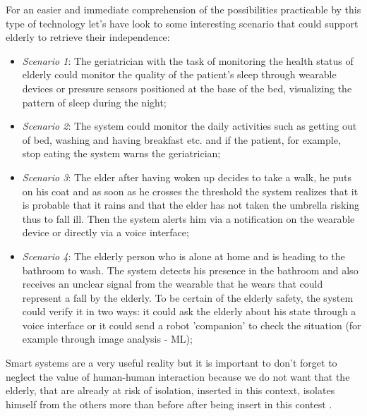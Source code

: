 \documentclass{thesisreport}
\begin{document}
 For an easier and immediate comprehension of the possibilities practicable by this type of technology let's have look to some interesting scenario that could support elderly to retrieve their independence:
 \begin{itemize}
     \item \textit{Scenario 1}: The geriatrician with the task of monitoring the health status of elderly could monitor the quality of the patient's sleep through wearable devices or pressure sensors positioned at the base of the bed, visualizing the pattern of sleep during the night;
     \item \textit{Scenario 2}: The system could monitor the daily activities such as getting out of bed, washing and having breakfast etc. and if the patient, for example, stop eating the system warns the geriatrician;
     \item \textit{Scenario 3}: The elder after having woken up decides to take a walk, he puts on his coat and as soon as he crosses the threshold the system realizes that it is probable that it rains and that the elder has not taken the umbrella risking thus to fall ill. Then the system alerts him via a notification on the wearable device or directly via a voice interface;
     \item \textit{Scenario 4}: The elderly person who is alone at home  and is heading to the bathroom to wash. The system detects his presence in the bathroom and also receives an unclear signal from the wearable that he wears that could represent a fall by the elderly. To be certain of the elderly safety, the system could verify it  in two ways: it could ask the elderly about his state through a voice interface or it could send a robot 'companion' to check the situation (for example through image analysis - ML);
 \end{itemize}
 
 Smart systems are a very useful reality but it is important to don't forget to neglect the value of human-human interaction because we do not want that the elderly, that are already at risk of isolation, inserted in this context, isolates himself from the others more than before after being insert in this contest \cite{phdthesis}.
 
\end{document}
